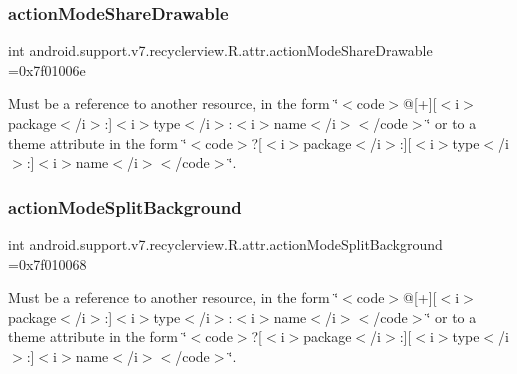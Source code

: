 \subsubsection{\texorpdfstring{action\+Mode\+Share\+Drawable}{actionModeShareDrawable}}
{\footnotesize\ttfamily int android.\+support.\+v7.\+recyclerview.\+R.\+attr.\+action\+Mode\+Share\+Drawable =0x7f01006e\hspace{0.3cm}{\ttfamily [static]}}

Must be a reference to another resource, in the form \char`\"{}$<$code$>$@\mbox{[}+\mbox{]}\mbox{[}$<$i$>$package$<$/i$>$\+:\mbox{]}$<$i$>$type$<$/i$>$\+:$<$i$>$name$<$/i$>$$<$/code$>$\char`\"{} or to a theme attribute in the form \char`\"{}$<$code$>$?\mbox{[}$<$i$>$package$<$/i$>$\+:\mbox{]}\mbox{[}$<$i$>$type$<$/i$>$\+:\mbox{]}$<$i$>$name$<$/i$>$$<$/code$>$\char`\"{}. \mbox{\label{classandroid_1_1support_1_1v7_1_1recyclerview_1_1R_1_1attr_aed89615f054c19f34b8303604435435c}} 
\subsubsection{\texorpdfstring{action\+Mode\+Split\+Background}{actionModeSplitBackground}}
{\footnotesize\ttfamily int android.\+support.\+v7.\+recyclerview.\+R.\+attr.\+action\+Mode\+Split\+Background =0x7f010068\hspace{0.3cm}{\ttfamily [static]}}

Must be a reference to another resource, in the form \char`\"{}$<$code$>$@\mbox{[}+\mbox{]}\mbox{[}$<$i$>$package$<$/i$>$\+:\mbox{]}$<$i$>$type$<$/i$>$\+:$<$i$>$name$<$/i$>$$<$/code$>$\char`\"{} or to a theme attribute in the form \char`\"{}$<$code$>$?\mbox{[}$<$i$>$package$<$/i$>$\+:\mbox{]}\mbox{[}$<$i$>$type$<$/i$>$\+:\mbox{]}$<$i$>$name$<$/i$>$$<$/code$>$\char`\"{}. \mbox{\label{classandroid_1_1support_1_1v7_1_1recyclerview_1_1R_1_1attr_a5963aa9e28e16b83a7e99e4fd7f428c6}} 
